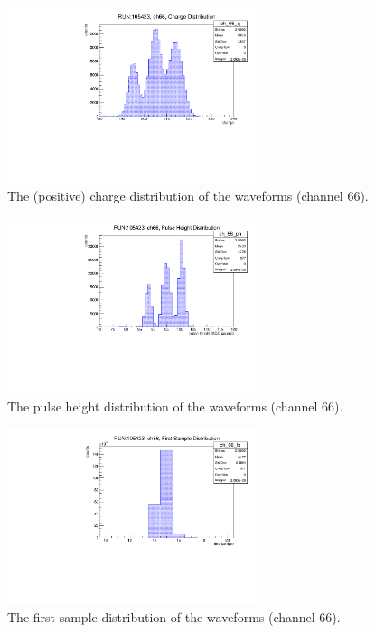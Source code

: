 \begin{figure}[!h]
      \centering
      \includegraphics[width=0.65\textwidth]{figures/pdf/charge.pdf}
      \caption[The (positive) charge distribution of the waveforms.]{The (positive) charge distribution of the waveforms (channel 66).}
      \label{fig:ch1}
  \end{figure}

\begin{figure}[!h]
  \centering
  \includegraphics[width=0.65\textwidth]{figures/pdf/pulseheight.pdf}
  \caption[The pulse height distribution of the waveforms.]{The pulse height distribution of the waveforms (channel 66).}
  \label{fig:ph2}
\end{figure}

\begin{figure}[!h]
  \centering
  \includegraphics[width=0.65\textwidth]{figures/pdf/fs.pdf}
  \caption[The first sample distribution of the waveforms.]{The first sample distribution of the waveforms (channel 66).}
  \label{fig:fs2}
\end{figure}


